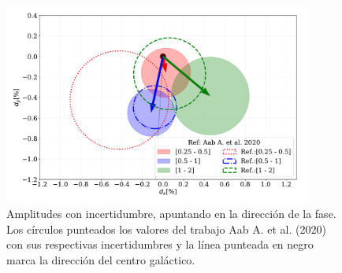 \begin{figure}[H]
    \begin{small}
        \begin{center}
            \includegraphics[width=0.9\textwidth]{comparando_sigmas_v3.pdf}
        \end{center}
        \caption{Amplitudes con incertidumbre, apuntando en la dirección  de la fase. Los círculos punteados los valores del trabajo Aab A. et al. (2020) con sus respectivas incertidumbres y la línea punteada en negro marca la dirección del centro galáctico.}
        \label{fig:incertidumbre}
    \end{small}
\end{figure}

